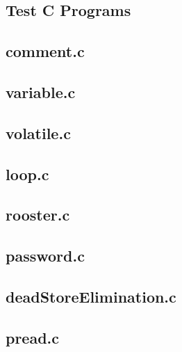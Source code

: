 
\onecolumn
\begin{appendices}
\chapter{Test C Programs}
\label{app:testPrograms}

\section{comment.c}


\section{variable.c}


\section{volatile.c}


\section{loop.c}


\section{rooster.c}


\section{password.c}


\section{deadStoreElimination.c}


\section{pread.c}



\end{appendices}
